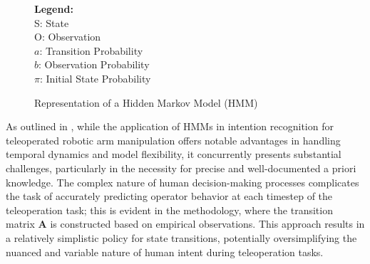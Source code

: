 \begin{itemize}
\begin{figure}[ht]
\begin{adjustbox}{center}
    \end{adjustbox}
    \hspace{5mm}
    \begin{adjustbox}{valign=t}
    \begin{minipage}[b]{0.4\textwidth}
            \textbf{Legend:}\\
            S: State\\
            O: Observation\\
            $a$: Transition Probability\\
            $b$: Observation Probability\\
            $\pi$: Initial State Probability
    \end{minipage}
    \end{adjustbox}
    \label{fig:Representation of a Hidden Markov Model (HMM)}
    \caption{Representation of a Hidden Markov Model (HMM)}
    \end{figure}
    
    As outlined in , while the application of HMMs in intention recognition for teleoperated robotic arm manipulation offers notable advantages in handling temporal dynamics and model flexibility, it concurrently presents substantial challenges, particularly in the necessity for precise and well-documented a priori knowledge.
    The complex nature of human decision-making processes complicates the task of accurately predicting operator behavior at each timestep of the teleoperation task; this is evident in the methodology, where the transition matrix $\textbf{A}$ is constructed based on empirical observations. This approach results in a relatively simplistic policy for state transitions, potentially oversimplifying the nuanced and variable nature of human intent during teleoperation tasks.
    






\end{itemize}

